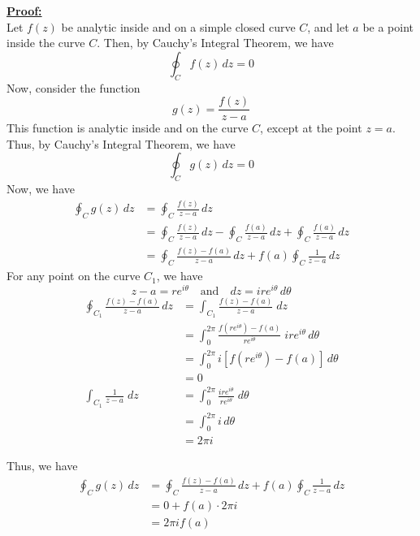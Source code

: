 \underline{\textbf{Proof:}} \\
Let $f(z)$ be analytic inside and on a simple closed curve $C$, and let $a$ be a point inside the curve $C$. Then, by Cauchy's Integral Theorem, we have
\begin{equation*}
    \oint_C f(z) \, dz = 0
\end{equation*}
Now, consider the function
\begin{equation*}
    g(z) = \frac{f(z)}{z-a}
\end{equation*}
This function is analytic inside and on the curve $C$, except at the point $z=a$. Thus, by Cauchy's Integral Theorem, we have
\begin{equation*}
    \oint_C g(z) \, dz = 0
\end{equation*}
Now, we have
\begin{align*}
    \oint_C g(z) \, dz &= \oint_C \frac{f(z)}{z-a} \, dz \\
    &= \oint_C \frac{f(z)}{z-a} \, dz - \oint_C \frac{f(a)}{z-a} \, dz + \oint_C \frac{f(a)}{z-a} \, dz \\
    &= \oint_C \frac{f(z) - f(a)}{z-a} \, dz + f(a) \oint_C \frac{1}{z-a} \, dz
\end{align*}
For any point on the curve $C_1$, we have
\[
    z - a = re^{i\theta}
    \quad \text{and} \quad
    dz = ire^{i\theta} \, d\theta
\] 
\begin{align*}
    \oint_{C_1} \frac{f(z) - f(a)}{z-a} \, dz &= \int_{C_1}^{} {\frac{f(z) - f(a)}{z-a}} \; dz \\
    &= \int_{0}^{2\pi} {\frac{f(re^{i\theta}) - f(a)}{re^{i\theta}}} \; ire^{i\theta} \, d{\theta} \\
    &= \int_{0}^{2\pi} i \left[ f(re^{i\theta}) - f(a) \right] \, d{\theta} \\
    &= 0 \\
    \int_{C_1}^{} {\frac{1}{z-a}} \; d{z} &= \int_{0}^{2\pi} {\frac{ire^{i\theta}}{re^{i\theta}}} \; d{\theta} \\
    &= \int_{0}^{2\pi} i \, d{\theta} \\
    &= 2\pi i
\end{align*}

Thus, we have
\begin{align*}
    \oint_C g(z) \, dz &= \oint_C \frac{f(z) - f(a)}{z-a} \, dz + f(a) \oint_C \frac{1}{z-a} \, dz \\
    &= 0 + f(a) \cdot 2\pi i \\
    &= 2\pi i f(a)
\end{align*}

